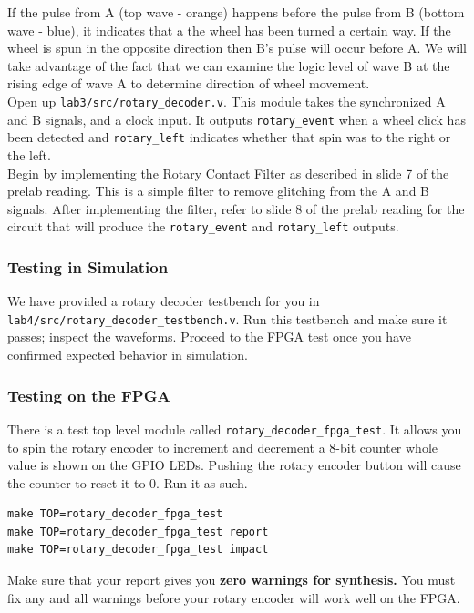 \documentclass[11pt]{article}
\begin{document}
If the pulse from A (top wave - orange) happens before the pulse from B (bottom wave - blue), it indicates that a the wheel has been turned a certain way. If the wheel is spun in the opposite direction then B's pulse will occur before A. We will take advantage of the fact that we can examine the logic level of wave B at the rising edge of wave A to determine direction of wheel movement.\\

Open up \verb|lab3/src/rotary_decoder.v|. This module takes the synchronized A and B signals, and a clock input. It outputs \verb|rotary_event| when a wheel click has been detected and \verb|rotary_left| indicates whether that spin was to the right or the left.\\

Begin by implementing the Rotary Contact Filter as described in slide 7 of the prelab reading. This is a simple filter to remove glitching from the A and B signals. After implementing the filter, refer to slide 8 of the prelab reading for the circuit that will produce the \verb|rotary_event| and \verb|rotary_left| outputs.

\subsubsection{Testing in Simulation}
We have provided a rotary decoder testbench for you in \verb|lab4/src/rotary_decoder_testbench.v|. Run this testbench and make sure it passes; inspect the waveforms. Proceed to the FPGA test once you have confirmed expected behavior in simulation.

\subsubsection{Testing on the FPGA}
There is a test top level module called \verb|rotary_decoder_fpga_test|. It allows you to spin the rotary encoder to increment and decrement a 8-bit counter whole value is shown on the GPIO LEDs. Pushing the rotary encoder button will cause the counter to reset it to 0. Run it as such.

\begin{verbatim}
make TOP=rotary_decoder_fpga_test
make TOP=rotary_decoder_fpga_test report
make TOP=rotary_decoder_fpga_test impact
\end{verbatim} 

Make sure that your report gives you \textbf{zero warnings for synthesis.} You must fix any and all warnings before your rotary encoder will work well on the FPGA.\\
\end{document}
